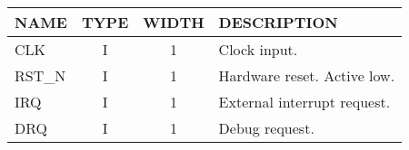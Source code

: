 {
\footnotesize
\begin{tabularx}{0.9\textwidth}{|l|c|c|X|}
  \hline
  \cellcolor{gray!20}\textbf{NAME} & \cellcolor{gray!20}\textbf{TYPE} & \cellcolor{gray!20}\textbf{WIDTH} & \cellcolor{gray!20}\textbf{DESCRIPTION} \\
  \hline
  CLK & I & 1 & Clock input. \\
  \hline
  RST\_N & I & 1 & Hardware reset. Active low. \\
  \hline
  IRQ & I & 1 & External interrupt request. \\
  \hline
  DRQ & I & 1 & Debug request. \\
  \hline
\end{tabularx}
}
